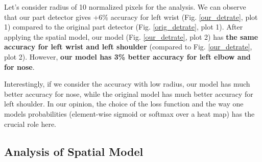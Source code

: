 \documentclass[a4paper,10pt]{article}
\begin{document}
	Let's consider radius of 10 normalized pixels for the analysis. We can observe that our part detector gives +6\% accuracy for left wrist (Fig. \ref{our_detrate}, plot 1) compared to the original part detector (Fig. \ref{orig_detrate}, plot 1). After applying the spatial model, our model (Fig. \ref{our_detrate}, plot 2) has \textbf{the same accuracy for left wrist and left shoulder} (compared to Fig. \ref{our_detrate}, plot 2). However, \textbf{our model has 3\% better accuracy for left elbow and for nose}. 
	
	Interestingly, if we consider the accuracy with low radius, our model has much better accuracy for nose, while the original model has much better accuracy for left shoulder. In our opinion, the choice of the loss function and the way one models probabilities (element-wise sigmoid or softmax over a heat map) has the crucial role here.
	
	
	\subsection{Analysis of Spatial Model}
	
\end{document}
